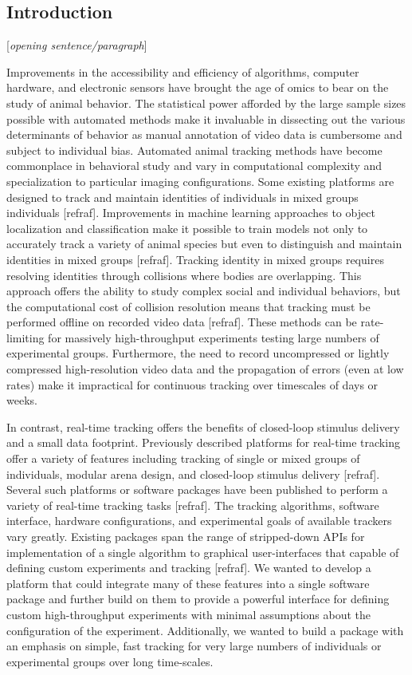 \documentclass[10pt]{article}
\begin{document}
\vspace{1cm}
\begin{multicols}{2}
\section*{Introduction}

[\textit{opening sentence/paragraph}]

Improvements in the accessibility and efficiency of algorithms, computer hardware, and electronic sensors have brought the age of omics to bear on the study of animal behavior. The statistical power afforded by the large sample sizes possible with automated methods make it invaluable in dissecting out the various determinants of behavior as manual annotation of video data is cumbersome and subject to individual bias. Automated animal tracking methods have become commonplace in behavioral study and vary in computational complexity and specialization to particular imaging configurations. Some existing platforms are designed to track and maintain identities of individuals in mixed groups individuals [refraf]. Improvements in machine learning approaches to object localization and classification make it possible to train models not only to accurately track a variety of animal species but even to distinguish and maintain identities in mixed groups [refraf]. Tracking identity in mixed groups requires resolving identities through collisions where bodies are overlapping. This approach offers the ability to study complex social and individual behaviors, but the computational cost of collision resolution means that tracking must be performed offline on recorded video data [refraf]. These methods can be rate-limiting for massively high-throughput experiments testing large numbers of experimental groups. Furthermore, the need to record uncompressed or lightly compressed high-resolution video data and the propagation of errors (even at low rates) make it impractical for continuous tracking over timescales of days or weeks.

In contrast, real-time tracking offers the benefits of closed-loop stimulus delivery and a small data footprint. Previously described platforms for real-time tracking offer a variety of features including tracking of single or mixed groups of individuals, modular arena design, and closed-loop stimulus delivery [refraf]. Several such platforms or software packages have been published to perform a variety of real-time tracking tasks [refraf]. The tracking algorithms, software interface, hardware configurations, and experimental goals of available trackers vary greatly. Existing packages span the range of stripped-down APIs for implementation of a single algorithm to graphical user-interfaces that capable of defining custom experiments and tracking [refraf]. We wanted to develop a platform that could integrate many of these features into a single software package and further build on them to provide a powerful interface for defining custom high-throughput experiments with minimal assumptions about the configuration of the experiment. Additionally, we wanted to build a package with an emphasis on simple, fast tracking for very large numbers of individuals or experimental groups over long time-scales. 


\end{multicols}
\end{document}
